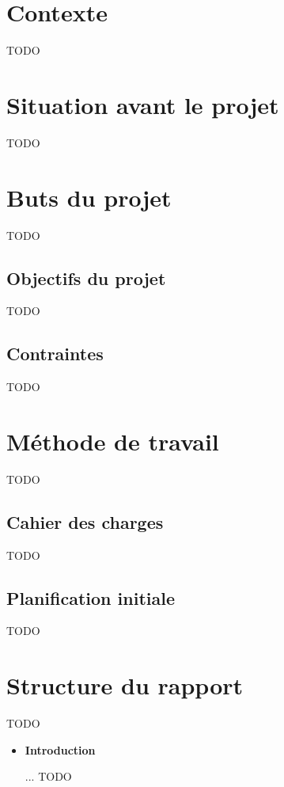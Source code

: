 \documentclass{HEIAarticle}
\begin{document}
\section{Contexte}

TODO

\section{Situation avant le projet}

TODO

\section{Buts du projet}

TODO

\subsection{Objectifs du projet}

TODO

\subsection{Contraintes}

TODO

\section{Méthode de travail}

TODO

\subsection{Cahier des charges}

TODO

\subsection{Planification initiale}
\label{planification}

TODO

\section{Structure du rapport}

TODO

\begin{itemize}
    \item \textbf{Introduction}

    ...
    TODO
\end{itemize}
\end{document}
